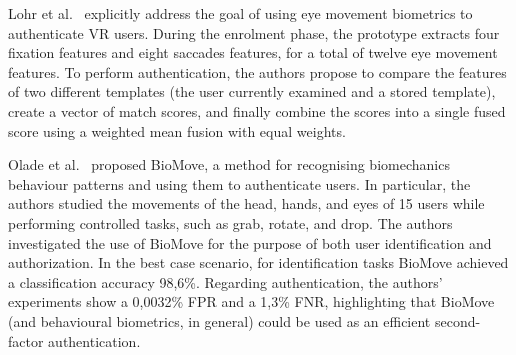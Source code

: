 \documentclass[journal]{IEEEtran}
\begin{document}
Lohr et al.~\cite{lohr2018,lohr2020} explicitly address the goal of using eye movement biometrics to authenticate VR users. During the enrolment phase, the prototype extracts four fixation features and eight saccades features, for a total of twelve eye movement features. To perform authentication, the authors propose to compare the features of two different templates (the user currently examined and a stored template), create a vector of match scores, and finally combine the scores into a single fused score using a weighted mean fusion with equal weights.

Olade et al.~\cite{olade2020biomove} proposed BioMove, a method for recognising biomechanics behaviour patterns and using them to authenticate users. In particular, the authors studied the movements of the head, hands, and eyes of 15 users while performing controlled tasks, such as grab, rotate, and drop. The authors investigated the use of BioMove for the purpose of both user identification and authorization. In the best case scenario, for identification tasks BioMove achieved a classification accuracy 98,6\%. Regarding authentication, the authors' experiments show a 0,0032\% FPR and a 1,3\% FNR, highlighting that BioMove (and behavioural biometrics, in general) could be used as an efficient second-factor authentication.
\end{document}
